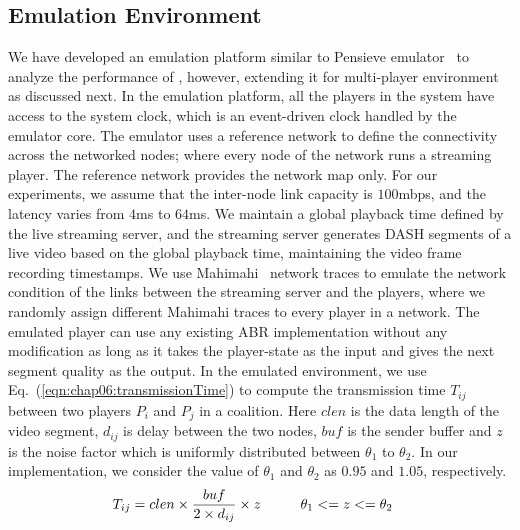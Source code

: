 \subsection{Emulation Environment}
\label{sec:chap06:simulatorprop}
We have developed an emulation platform similar to Pensieve emulator~\cite{mao2017neural} to analyze the performance of \our, however, extending it for multi-player environment as discussed next. In the emulation platform, all the players in the system have access to the system clock, which is an event-driven clock handled by the emulator core. The emulator uses a reference network to define the connectivity across the networked nodes; where every node of the network runs a streaming player. The reference network provides the network map only. For our experiments, we assume that the inter-node link capacity is $100$mbps, and the latency varies from $4$ms to $64$ms. We maintain a global playback time defined by the live streaming server, and the streaming server generates DASH segments of a live video based on the global playback time, maintaining the video frame recording timestamps. We use Mahimahi~\cite{Netravali2015} network traces to emulate the network condition of the links between the streaming server and the players, where we randomly assign different Mahimahi traces to every player in a network. The emulated player can use any existing ABR implementation without any modification as long as it takes the player-state as the input and gives the next segment quality as the output.
In the emulated environment, we use Eq.~(\ref{eqn:chap06:transmissionTime}) to compute the transmission time $T_{ij}$ between two players $P_i$ and $P_j$ in a coalition. Here $clen$ is the data length of the video segment, $d_{ij}$ is delay between the two nodes, $buf$ is the sender buffer and $z$ is the noise factor which is uniformly distributed between $\theta_1$ to $\theta_2$. In our implementation, we consider the value of $\theta_1$ and $\theta_2$ as $0.95$ and $1.05$, respectively.
\begin{align}
T_{ij} = clen\times \frac{buf}{2\times d_{ij}} \times z \mbox{\hspace{1cm}}& \theta_1 <= z <= \theta_2
\label{eqn:chap06:transmissionTime}
\end{align}

